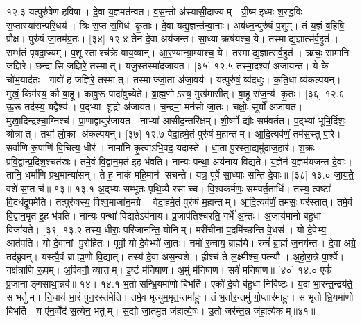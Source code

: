 १२.३
यत्पुरु॑षेण ह॒विषा। दे॒वा य॒ज्ञमत॑न्वत। व॒स॒न्तो अ॑स्यासी॒दाज्यम्। ग्री॒ष्म इ॒ध्मः  श॒रद्ध॒विः। स॒प्तास्या॑सन्परि॒धय॑। त्रिः स॒प्त स॒मिध॑ कृ॒ताः। दे॒वा यद्य॒ज्ञन्त॑न्वा॒नाः। अब॑ध्न॒न्पुरु॑षं प॒शुम्। तं य॒ज्ञं ब॒\ar{}हिषि॒ प्रौक्ष\sn{}। पुरु॑षं जा॒तम॑ग्र॒तः। [३४]
१२.४
तेन॑ दे॒वा अय॑जन्त। सा॒ध्या ऋष॑यश्च॒ ये। तस्माद्य॒ज्ञात्स॑र्व॒हुत॑। सम्भृ॑तं पृषदा॒ज्यम्। प॒शूस्ताश्च॑क्रे वाय॒व्यान्॑। आ॒र॒ण्यान्ग्रा॒म्याश्च॒ ये। तस्माद्य॒ज्ञात्स॑र्व॒हुत॑। ऋचः॒ सामा॑नि जज्ञिरे। छन्दासि जज्ञिरे॒ तस्मात्। यजु॒स्तस्मा॑दजायत। [३५]
१२.५
तस्मा॒दश्वा॑ अजायन्त। ये के चो॑भ॒याद॑तः। गावो॑ ह जज्ञिरे॒ तस्मात्। तस्माज्जा॒ता अ॑जा॒वय॑। यत्पुरु॑षं॒ व्य॑दधुः। क॒ति॒धा व्य॑कल्पयन्। मुखं॒ किम॑स्य॒ कौ बा॒हू। कावू॒रू पादा॑वुच्येते। ब्रा॒ह्म॒णोऽस्य॒ मुख॑मासीत्। बा॒हू रा॑ज॒न्य॑ कृ॒तः। [३६]
१२.६
ऊ॒रू तद॑स्य॒ यद्वैश्य॑। प॒द्भ्या शू॒द्रो अ॑जायत। च॒न्द्रमा॒ मन॑सो जा॒तः। चक्षोः॒ सूर्यो॑ अजायत। मुखा॒दिन्द्र॑श्चा॒ग्निश्च॑। प्रा॒णाद्वा॒युर॑जायत। नाभ्या॑ आसीद॒न्तरि॑क्षम्। शी॒र्ष्णो द्यौः सम॑वर्तत। प॒द्भ्यां भूमि॒र्दिशः॒ श्रोत्रात्। तथा॑ लो॒का अ॑कल्पयन्। [३७]
१२.७
वेदा॒हमे॒तं पुरु॑षं म॒हान्तम्। आ॒दि॒त्यव॑र्णं॒ तम॑स॒स्तु पा॒रे। सर्वा॑णि रू॒पाणि॑ वि॒चित्य॒ धीर॑। नामा॑नि कृ॒त्वाऽभि॒वद॒\an{} यदास्ते। धा॒ता पु॒रस्ता॒द्यमु॑दाज॒हार॑। श॒क्रः प्रवि॒द्वान्प्र॒दिश॒श्चत॑स्रः। तमे॒वं वि॒द्वान॒मृत॑ इ॒ह भ॑वति। नान्यः पन्था॒ अय॑नाय विद्यते। य॒ज्ञेन॑ य॒ज्ञम॑यजन्त दे॒वाः। तानि॒ धर्मा॑णि प्रथ॒मान्या॑सन्। ते ह॒ नाकं॑ महि॒मान॑ सचन्ते। यत्र॒ पूर्वे॑ सा॒ध्याः सन्ति॑ दे॒वाः॥ [३८]
१३.०
जा॒य॒ते॒ वशे॑ स॒प्त च॑॥ १३॥
\anuvakamend
१३.१
अ॒द्भ्यः सम्भू॑तः पृथि॒व्यै रसाच्च। वि॒श्वक॑र्मणः॒ सम॑वर्त॒ताधि॑। तस्य॒ त्वष्टा॑ वि॒दध॑द्रू॒पमे॑ति। तत्पुरु॑षस्य॒ विश्व॒माजा॑न॒मग्रे। वेदा॒हमे॒तं पुरु॑षं म॒हान्तम्। आ॒दि॒त्यव॑र्णं॒ तम॑सः॒ पर॑स्तात्। तमे॒वं वि॒द्वान॒मृत॑ इ॒ह भ॑वति। नान्यः पन्था॑ विद्य॒तेऽय॑नाय। प्र॒जाप॑तिश्चरति॒ गर्भे॑ अ॒न्तः। अ॒जाय॑मानो बहु॒धा विजा॑यते। [३९]
१३.२
तस्य॒ धीराः॒ परि॑जानन्ति॒ योनिम्। मरी॑चीनां प॒दमि॑च्छन्ति वे॒धस॑। यो दे॒वेभ्य॒ आत॑पति। यो दे॒वानां पु॒रोहि॑तः। पूर्वो॒ यो दे॒वेभ्यो॑ जा॒तः। नमो॑ रु॒चाय॒ ब्राह्म॑ये। रुचं॑ ब्रा॒ह्मं ज॒नय॑न्तः। दे॒वा अग्रे॒ तद॑ब्रुवन्। यस्त्वै॒वं ब्राह्म॒णो वि॒द्यात्। तस्य॑ दे॒वा अस॒न्वशे। ह्रीश्च॑ ते ल॒क्ष्मीश्च॒ पत्न्यौ। अ॒हो॒रा॒त्रे पा॒र्श्वे। नक्ष॑त्राणि रू॒पम्। अ॒श्विनौ॒ व्यात्तम्। इ॒ष्टं म॑निषाण। अ॒मुं म॑निषाण। सर्वं॑ मनिषाण॥ [४०]
१४.०
एकं॑ प्र॒जानाङ्गसाथा॒न्नव॑॥ १४।
\anuvakamend
१४.१
भ॒र्ता सन्भ्रि॒यमा॑णो बिभर्ति। एको॑ दे॒वो ब॑हु॒धा निवि॑ष्टः। य॒दा भा॒रन्त॒न्द्रय॑ते॒ स भर्तुम्। नि॒धाय॑ भा॒रं पुन॒रस्त॑मेति। तमे॒व मृ॒त्युम॒मृत॒न्तमा॑हुः। तं भ॒र्तार॒न्तमु॑ गो॒प्तार॑माहुः। स भृ॒तो भ्रि॒यमा॑णो बिभर्ति। य ए॑न॒व्वेँद॑ स॒त्येन॒ भर्तुम्। स॒द्यो जा॒तमु॒त ज॑हात्ये॒षः। उ॒तो जर॑न्त॒न्न ज॑हा॒त्येकम्॥४१॥
